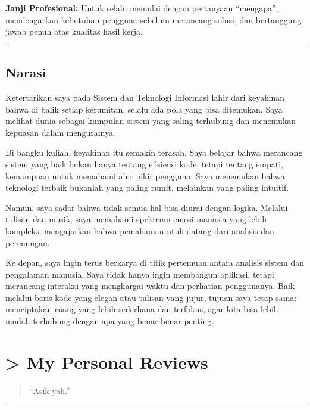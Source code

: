 \documentclass[
  letterpaper,
  DIV=11,
  numbers=noendperiod]{scrreprt}
\begin{document}
\textbf{Janji Profesional:} Untuk selalu memulai dengan pertanyaan
``mengapa'', mendengarkan kebutuhan pengguna sebelum merancang solusi,
dan bertanggung jawab penuh atas kualitas hasil kerja.

\begin{center}\rule{0.5\linewidth}{0.5pt}\end{center}

\section{Narasi}\label{narasi}

Ketertarikan saya pada Sistem dan Teknologi Informasi lahir dari
keyakinan bahwa di balik setiap kerumitan, selalu ada pola yang bisa
ditemukan. Saya melihat dunia sebagai kumpulan sistem yang saling
terhubung dan menemukan kepuasan dalam mengurainya.

Di bangku kuliah, keyakinan itu semakin terasah. Saya belajar bahwa
merancang sistem yang baik bukan hanya tentang efisiensi kode, tetapi
tentang empati, kemampuan untuk memahami alur pikir pengguna. Saya
menemukan bahwa teknologi terbaik bukanlah yang paling rumit, melainkan
yang paling intuitif.

Namun, saya sadar bahwa tidak semua hal bisa diurai dengan logika.
Melalui tulisan dan musik, saya memahami spektrum emosi manusia yang
lebih kompleks, mengajarkan bahwa pemahaman utuh datang dari analisis
dan perenungan.

Ke depan, saya ingin terus berkarya di titik pertemuan antara analisis
sistem dan pengalaman manusia. Saya tidak hanya ingin membangun
aplikasi, tetapi merancang interaksi yang menghargai waktu dan perhatian
penggunanya. Baik melalui baris kode yang elegan atau tulisan yang
jujur, tujuan saya tetap sama: menciptakan ruang yang lebih sederhana
dan terfokus, agar kita bisa lebih mudah terhubung dengan apa yang
benar-benar penting.


\chapter{\textgreater{} My Personal Reviews}\label{my-personal-reviews}

\begin{quote}
``Asik yah.''
\end{quote}

\begin{center}\rule{0.5\linewidth}{0.5pt}\end{center}
\end{document}
